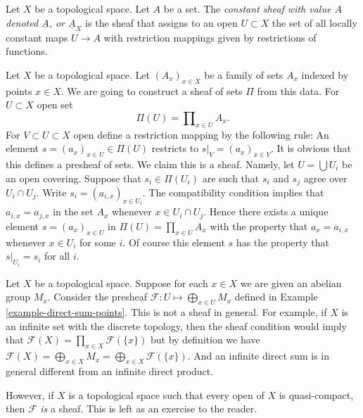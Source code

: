 \begin{definition}
\label{definition-constant-sheaf}
Let $X$ be a topological space. Let $A$ be a set.
The {\it constant sheaf with value $A$ denoted $\underline{A}$, or
$\underline{A}_X$} is the sheaf that assigns to an open $U \subset X$
the set of all locally constant maps $U \to A$ with restriction mappings
given by restrictions of functions.
\end{definition}

\begin{example}
\label{example-sheaf-product-pointwise}
Let $X$ be a topological space. Let $(A_x)_{x \in X}$ be 
a family of sets $A_x$ indexed by points $x \in X$. We are
going to construct a sheaf of sets $\Pi$ from this data.
For $U \subset X$ open set
$$
\Pi(U) = \prod\nolimits_{x \in U} A_x.
$$
For $V \subset U \subset X$ open define
a restriction mapping by the following rule: An element
$s = (a_x)_{x\in U} \in \Pi(U)$ restricts
to $s|_V = (a_x)_{x \in V}$. It is obvious that this
defines a presheaf of sets. We claim this is a sheaf.
Namely, let $U = \bigcup U_i$ be an open covering.
Suppose that $s_i \in \Pi(U_i)$ are
such that $s_i$ and $s_j$ agree over $U_i \cap U_j$. Write
$s_i = (a_{i,x})_{x\in U_i}$. The compatibility condition implies that
$a_{i, x} = a_{j, x}$ in the set $A_x$ whenever $x \in U_i \cap U_j$. 
Hence there exists a unique element $s = (a_x)_{x\in U}$
in $\Pi(U) = \prod_{x\in U} A_x$ with the property that
$a_x = a_{i, x}$ whenever $x \in U_i$ for some $i$. Of course this
element $s$ has the property that $s|_{U_i} = s_i$ for all $i$.
\end{example}

\begin{example}
\label{example-direct-sum-points-not-sheaf}
Let $X$ be a topological space.
Suppose for each $x\in X$ we are given an abelian group $M_x$.
Consider the presheaf $\mathcal{F} : U \mapsto \bigoplus_{x \in U} M_x$
defined in Example \ref{example-direct-sum-points}. This
is not a sheaf in general. For example, if $X$ is an infinite set
with the discrete topology, then the sheaf condition 
would imply that $\mathcal{F}(X) = \prod_{x\in X} \mathcal{F}(\{x\})$
but by definition we have $\mathcal{F}(X)
= \bigoplus_{x \in X} M_x = \bigoplus_{x \in X} \mathcal{F}(\{x\})$.
And an infinite direct sum is in general different from an infinite
direct product.

\medskip\noindent
However, if $X$ is a topological space such that every open
of $X$ is quasi-compact, then $\mathcal{F}$ {\it is} a sheaf.
This is left as an exercise to the reader.
\end{example}



